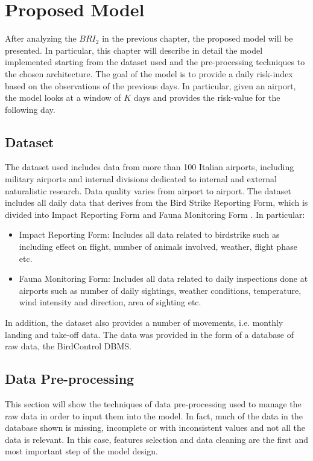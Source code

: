 \chapter{Proposed Model} \label{ch:Ch.4}
After analyzing the $BRI_2$ in the previous chapter, the proposed model will be presented. In particular, this chapter will describe in detail the model implemented starting from the dataset used and the pre-processing techniques to the chosen architecture. The goal of the model is to provide a daily risk-index based on the observations of the previous days. In particular, given an airport, the model looks at a window of $K$ days and provides the risk-value for the following day. 

\section{Dataset}
The dataset used includes data from more than 100 Italian airports, including military airports and internal divisions dedicated to internal and external naturalistic research. Data quality varies from airport to airport.
The dataset includes all daily data that derives from the Bird Strike Reporting Form, which is divided into Impact Reporting Form and Fauna Monitoring Form \cite{ENAC-Wildlifestrike}. In particular:

\begin{itemize}
    \item Impact Reporting Form: Includes all data related to birdstrike such as including effect on flight, number of animals involved, weather, flight phase etc.
    \item Fauna Monitoring Form: Includes all data related to daily inspections done at airports such as number of daily sightings, weather conditions, temperature, wind intensity and direction, area of sighting etc.
\end{itemize}
In addition, the dataset also provides a number of movements, i.e. monthly landing and take-off data.
The data was provided in the form of a database of raw data, the BirdControl DBMS. 


\section{Data Pre-processing}
This section will show the techniques of data pre-processing used to manage the raw data in order to input them into the model.
In fact, much of the data in the database shown is missing, incomplete or with inconsistent values and not all the data is relevant.
In this case, features selection and data cleaning are the first and most important step of the model design.

